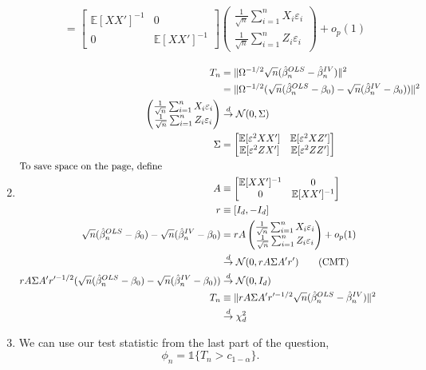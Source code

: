 \documentclass[11pt]{article}
\newcommand{\E}{\mathbb{E}}
\begin{document}
\begin{enumerate}[label=\alph*)]
\begin{align*}
&= \begin{bmatrix}\E[XX']^{-1} & 0 \\ 0 & \E[XX']^{-1}\end{bmatrix} \begin{pmatrix}\frac{1}{\sqrt{n}} \sum^n_{i = 1} X_i \varepsilon_i \\  \frac{1}{\sqrt{n}} \sum^n_{i = 1} Z_i \varepsilon_i\end{pmatrix} + o_p(1)
\end{align*}
\item
\begin{align*}
T_n &= \|\Omega^{-1/2} \sqrt{n}(\hat{\beta}^{OLS}_n - \hat{\beta}_n^{IV})\|^2\\
&= \|\Omega^{-1/2} (\sqrt{n} (\hat{\beta}_n^{OLS} - \beta_0) - \sqrt{n} (\hat{\beta}^{IV}_n - \beta_0))\|^2\\
\begin{pmatrix}\frac{1}{\sqrt{n}} \sum^n_{i = 1} X_i \varepsilon_i \\  \frac{1}{\sqrt{n}} \sum^n_{i = 1} Z_i \varepsilon_i\end{pmatrix} & \overset{d}{\to} \mathcal{N}(0, \Sigma)\\
\Sigma &= \begin{bmatrix}\E[\varepsilon^2XX'] & \E[\varepsilon^2XZ'] \\ \E[\varepsilon^2 ZX'] & \E[\varepsilon^2ZZ']\end{bmatrix}\\
\intertext{To save space on the page, define}
A &\equiv \begin{bmatrix}\E[XX']^{-1} & 0 \\ 0 & \E[XX']^{-1}\end{bmatrix}\\
r &\equiv [I_d, -I_d]\\
\sqrt{n}(\hat{\beta}^{OLS}_n - \beta_0) - \sqrt{n} (\hat{\beta}^{IV}_n - \beta_0) &= rA \begin{pmatrix} \frac{1}{\sqrt{n}} \sum^n_{i = 1} X_i \varepsilon_i \\\frac{1}{\sqrt{n}} \sum^n_{i = 1} Z_i \varepsilon_i\end{pmatrix} + o_p(1)\\
&\overset{d}{\to} \mathcal{N}(0, rA\Sigma A'r') \tag{CMT}\\
rA\Sigma A'r'^{-1/2} (\sqrt{n} (\hat{\beta}^{OLS}_n - \beta_0) - \sqrt{n}(\hat{\beta}^{IV}_n - \beta_0)) &\overset{d}{\to} \mathcal{N}(0, I_d)\\
T_n &\equiv \| rA\Sigma A'r'^{-1/2} \sqrt{n} (\hat{\beta}^{OLS}_n - \hat{\beta}^{IV}_n)\|^2\\
&\overset{d}{\to}\chi_d^2
\end{align*}
\item
We can use our test statistic from the last part of the question,
\[
\phi_n = \mathbb{1}\{T_n > c_{1 - \alpha}\}.
\]


\end{enumerate}
\end{document}

